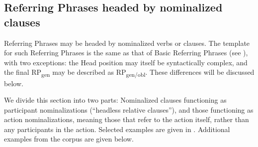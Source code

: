 \subsection{Referring Phrases headed by nominalized clauses}
\label{sec:referringphrasesheadedbynominalizedclauses}

Referring Phrases may be headed by nominalized verbs or clauses. The template for such Referring Phrases is the same as that of Basic Referring Phrases (see ), with two exceptions: the Head position may itself be syntactically complex, and the final RP\textsubscript{gen} may be described as RP\textsubscript{gen/obl}. These differences will be discussed below.

We divide this section into two parts: Nominalized clauses functioning as participant nominalizations (“headless relative clauses”), and those functioning as action nominalizations, meaning those that refer to the action itself, rather than any participants in the action. Selected examples are given in . Additional examples from the corpus are given below.

